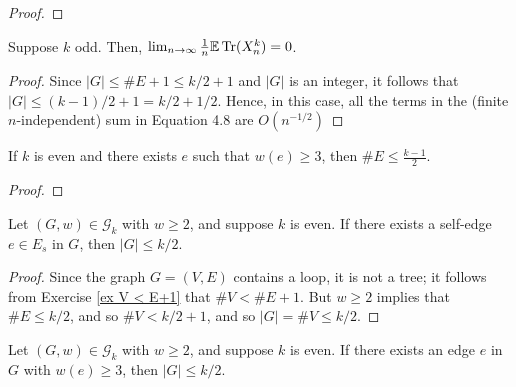 \begin{proof}
  \notready
\end{proof}




\begin{proposition}
  \label{prop:odd_case}
  \notready
  Suppose $k$ odd. Then, $\lim_{n\to\infty} \frac{1}{n}\mathbb{E}\operatorname{Tr}(X_n^k) = 0$.
\end{proposition}

\begin{proof}
  \notready
  Since $|G|\le \#E+1 \le k/2+1$ and $|G|$ is an integer, it follows that $|G|\le (k-1)/2+1 = k/2 + 1/2$.  Hence, in this case, all the terms in the (finite $n$-independent) sum in Equation 4.8 are $O(n^{-1/2})$
\end{proof}

\begin{lemma}
  \label{lem:edge_bound_large_w}
  \notready
  If $k$ is even and there exists $e$ such that $w(e) \ge 3$, then $\#E \le \frac{k-1}{2}$.
\end{lemma}

\begin{proof}
  \notready
\end{proof}



\begin{proposition}%
  \label{prop:g_bound_self_edge}
  \notready
  Let $(G,w)\in\mathcal{G}_k$ with $w\ge 2$, and suppose $k$ is even. If there exists a self-edge $e\in E_s$ in $G$, then $|G|\le k/2$.
\end{proposition}

\begin{proof}
  \notready
  Since the graph $G = (V,E)$ contains a loop, it is not a tree; it follows from Exercise \ref{ex V < E+1} that $\#V < \#E+1$.  But $w\ge 2$ implies that $\#E\le k/2$, and so $\#V < k/2+1$, and so $|G| = \#V \le k/2$.
\end{proof}

\begin{proposition}%
  \label{prop:g_bound_large_w}
  \notready
  Let $(G,w)\in\mathcal{G}_k$ with $w\ge 2$, and suppose $k$ is even. If there exists an edge $e$ in $G$ with $w(e)\ge 3$, then $|G|\le k/2$.
\end{proposition}

